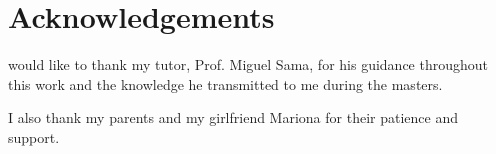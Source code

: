 
\chapter*{Acknowledgements}
\begin{SingleSpace}
 would like to thank my tutor, Prof. Miguel Sama,
for his guidance throughout this work and the knowledge he transmitted to me during the masters.

I also thank my parents and my girlfriend Mariona for their patience and support.
\end{SingleSpace}


\clearpage